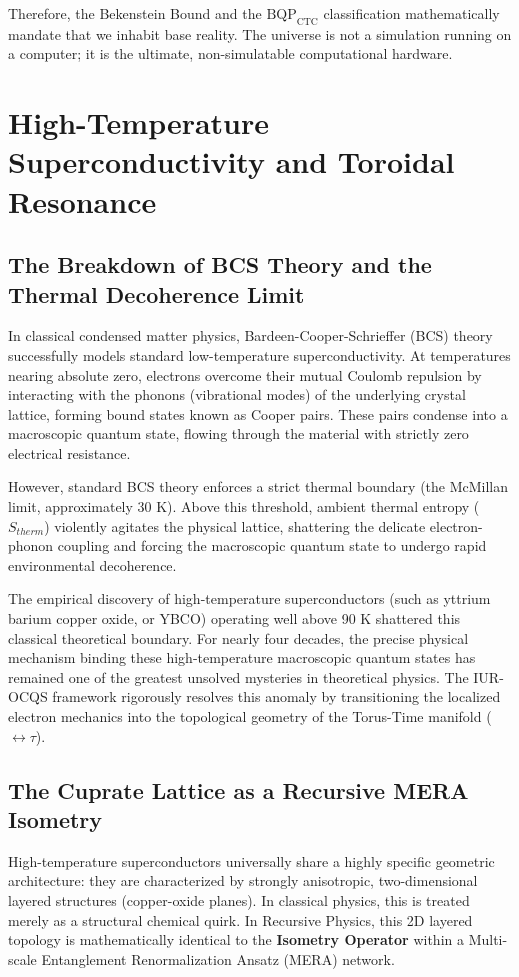 \documentclass[12pt,openany]{book}
\begin{document}
Therefore, the Bekenstein Bound and the $\text{BQP}_{\text{CTC}}$ classification mathematically mandate that we inhabit base reality. The universe is not a simulation running on a computer; it is the ultimate, non-simulatable computational hardware.

\chapter{High-Temperature Superconductivity and Toroidal Resonance}

\section{The Breakdown of BCS Theory and the Thermal Decoherence Limit}
In classical condensed matter physics, Bardeen-Cooper-Schrieffer (BCS) theory successfully models standard low-temperature superconductivity. At temperatures nearing absolute zero, electrons overcome their mutual Coulomb repulsion by interacting with the phonons (vibrational modes) of the underlying crystal lattice, forming bound states known as Cooper pairs. These pairs condense into a macroscopic quantum state, flowing through the material with strictly zero electrical resistance. 

However, standard BCS theory enforces a strict thermal boundary (the McMillan limit, approximately 30 K). Above this threshold, ambient thermal entropy ($S_{therm}$) violently agitates the physical lattice, shattering the delicate electron-phonon coupling and forcing the macroscopic quantum state to undergo rapid environmental decoherence. 

The empirical discovery of high-temperature superconductors (such as yttrium barium copper oxide, or YBCO) operating well above 90 K shattered this classical theoretical boundary. For nearly four decades, the precise physical mechanism binding these high-temperature macroscopic quantum states has remained one of the greatest unsolved mysteries in theoretical physics. The IUR-OCQS framework rigorously resolves this anomaly by transitioning the localized electron mechanics into the topological geometry of the Torus-Time manifold ($\leftrightarrow\tau$).

\section{The Cuprate Lattice as a Recursive MERA Isometry}
High-temperature superconductors universally share a highly specific geometric architecture: they are characterized by strongly anisotropic, two-dimensional layered structures (copper-oxide planes). In classical physics, this is treated merely as a structural chemical quirk. In Recursive Physics, this 2D layered topology is mathematically identical to the \textbf{Isometry Operator} within a Multi-scale Entanglement Renormalization Ansatz (MERA) network.
\end{document}
